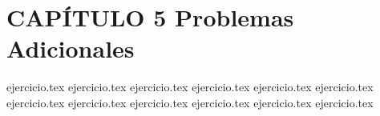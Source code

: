 
\section*{CAPÍTULO 5 \quad Problemas Adicionales}

\begin{enumerate}
    {ejercicio.tex}
    {ejercicio.tex}
    {ejercicio.tex}
    {ejercicio.tex}
    {ejercicio.tex}
    {ejercicio.tex}
    {ejercicio.tex}
    {ejercicio.tex}
    {ejercicio.tex}
    {ejercicio.tex}
    {ejercicio.tex}
    {ejercicio.tex}
\end{enumerate}
